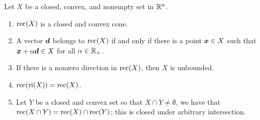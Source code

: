 \begin{proposition}\label{thm: recession cone theorem}
Let $X$ be a closed, convex, and nonempty set in $\mathbb R^n$. 
\begin{enumerate}
\item $\operatorname{rec}(X)$ is a closed and convex cone. 
\item A vector ${\boldsymbol d}$ belongs to $\operatorname{rec}(X)$ if and only if there is a point ${\boldsymbol x}\in X$ such that ${\boldsymbol x} + \alpha{\boldsymbol d} \in X$ for all $\alpha \in\mathbb R_+$.  
\item If there is a nonzero direction in $\operatorname{rec}(X)$, then $X$ is unbounded. 
\item $\operatorname{rec}(\operatorname{ri}(X)) = \operatorname{rec}(X)$. 
\item Let $Y$ be a closed and convex set so that $X\cap Y\neq \emptyset$, we have that $\operatorname{rec}(X\cap Y) = \operatorname{rec}(X)\cap\operatorname{rec}(Y)$; this is closed under arbitrary intersection. 
\end{enumerate}
\end{proposition}
